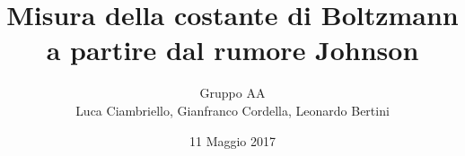 \documentclass[a4paper,11pt]{article}
\author{Gruppo AA \\ Luca Ciambriello, Gianfranco Cordella, Leonardo Bertini}
\title{Misura della costante di Boltzmann a partire dal rumore Johnson}
\date{11 Maggio 2017}
\newcommand{\insertpart}[2]{}
\begin{document}
\maketitle

\insertpart{parte1}{} 
\insertpart{parte2}{}
\insertpart{immagini}{}
\end{document}
